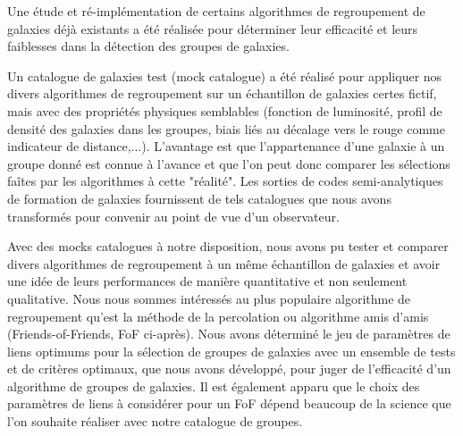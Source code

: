 Une étude et ré-implémentation de certains algorithmes de regroupement de
galaxies déjà existants a été réalisée pour déterminer leur efficacité et leurs
faiblesses dans la détection des groupes de galaxies.

Un catalogue de galaxies test (mock catalogue) a été réalisé pour appliquer nos
divers algorithmes de regroupement sur un échantillon de galaxies certes
fictif, mais avec des propriétés physiques semblables (fonction de luminosité,
profil de densité des galaxies dans les groupes, biais liés au décalage vers le
rouge comme indicateur de distance,...). L'avantage est que l'appartenance
d'une galaxie à un groupe donné est connue à l'avance et que l'on peut donc
comparer les sélections faîtes par les algorithmes à cette "réalité". Les
sorties de codes semi-analytiques de formation de galaxies fournissent de tels
catalogues que nous avons transformés pour convenir au point de vue d'un
observateur.

Avec des mocks catalogues à notre disposition, nous avons pu tester et comparer
divers algorithmes de regroupement à un même échantillon de galaxies et avoir
une idée de leurs performances de manière quantitative et non seulement
qualitative. Nous nous sommes intéressés au plus populaire algorithme de
regroupement qu'est la méthode de la percolation ou algorithme amis d'amis
(Friends-of-Friends, FoF ci-après). Nous avons déterminé le jeu de paramètres
de liens optimums pour la sélection de groupes de galaxies avec un ensemble de
tests et de critères optimaux, que nous avons développé, pour juger de
l'efficacité d'un algorithme de groupes de galaxies. Il est également apparu
que le choix des paramètres de liens à considérer pour un FoF dépend beaucoup
de la science que l'on souhaite réaliser avec notre catalogue de groupes.

